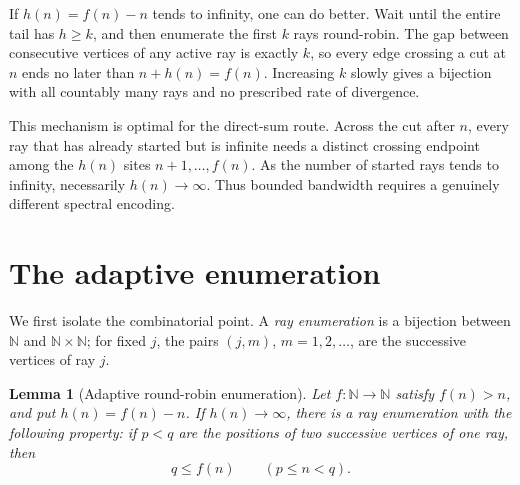 \documentclass[11pt]{article}
\newtheorem{lemma}{Lemma}
\theoremstyle{remark}
\newcommand{\N}{\mathbb N}
\begin{document}
If $h(n)=f(n)-n$ tends to infinity, one can do better.  Wait until the entire
tail has $h\geq k$, and then enumerate the first $k$ rays round-robin.  The gap
between consecutive vertices of any active ray is exactly $k$, so every edge
crossing a cut at $n$ ends no later than $n+h(n)=f(n)$.  Increasing $k$ slowly
gives a bijection with all countably many rays and no prescribed rate of
divergence.

This mechanism is optimal for the direct-sum route.  Across the cut after $n$,
every ray that has already started but is infinite needs a distinct crossing
endpoint among the $h(n)$ sites $n+1,\ldots,f(n)$.  As the number of started
rays tends to infinity, necessarily $h(n)\to\infty$.  Thus bounded bandwidth
requires a genuinely different spectral encoding.

\section{The adaptive enumeration}

We first isolate the combinatorial point.  A \emph{ray enumeration} is a
bijection between $\N$ and $\N\times\N$; for fixed $j$, the pairs $(j,m)$,
$m=1,2,\ldots$, are the successive vertices of ray $j$.

\begin{lemma}[Adaptive round-robin enumeration]\label{lem:enumeration}
Let $f:\N\to\N$ satisfy $f(n)>n$, and put $h(n)=f(n)-n$.  If
$h(n)\to\infty$, there is a ray enumeration with the following property: if
$p<q$ are the positions of two successive vertices of one ray, then
\begin{equation}\label{eq:cut}
 q\leq f(n)\qquad(p\leq n<q).
\end{equation}
\end{lemma}
\end{document}
